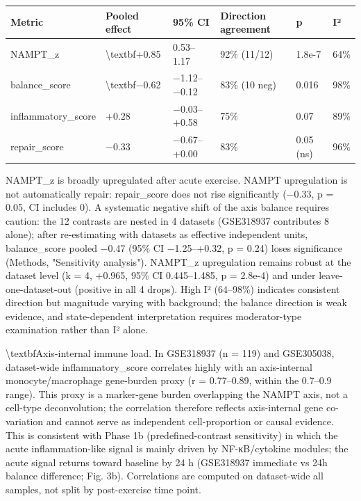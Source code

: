 \documentclass[11pt]{article}
\begin{document}
\begin{table}[h!]
\centering
\begin{tabular}{llllll}
\toprule
Metric & Pooled effect & 95\% CI & Direction agreement & p & I² \\
\midrule
NAMPT\_z & \textbackslash{}textbf{+0.85} & 0.53–1.17 & 92\% (11/12) & 1.8e-7 & 64\% \\
balance\_score & \textbackslash{}textbf{−0.62} & −1.12–−0.12 & 83\% (10 neg) & 0.016 & 98\% \\
inflammatory\_score & +0.28 & −0.03–+0.58 & 75\% & 0.07 & 89\% \\
repair\_score & −0.33 & −0.67–+0.00 & 83\% & 0.05 (ns) & 96\% \\
\bottomrule
\end{tabular}
\end{table}
\par\vspace{4pt}
NAMPT\_z is broadly upregulated after acute exercise. NAMPT upregulation is not automatically repair: repair\_score does not rise significantly (−0.33, p = 0.05, CI includes 0). A systematic negative shift of the axis balance requires caution: the 12 contrasts are nested in 4 datasets (GSE318937 contributes 8 alone); after re-estimating with datasets as effective independent units, balance\_score pooled −0.47 (95\% CI −1.25–+0.32, p = 0.24) loses significance (Methods, "Sensitivity analysis"). NAMPT\_z upregulation remains robust at the dataset level (k = 4, +0.965, 95\% CI 0.445–1.485, p = 2.8e-4) and under leave-one-dataset-out (positive in all 4 drops). High I² (64–98\%) indicates consistent direction but magnitude varying with background; the balance direction is weak evidence, and state-dependent interpretation requires moderator-type examination rather than I² alone.

\textbackslash{}textbf{Axis-internal immune load.} In GSE318937 (n = 119) and GSE305038, dataset-wide inflammatory\_score correlates highly with an axis-internal monocyte/macrophage gene-burden proxy (r = 0.77–0.89, within the 0.7–0.9 range). This proxy is a marker-gene burden overlapping the NAMPT axis, not a cell-type deconvolution; the correlation therefore reflects axis-internal gene co-variation and cannot serve as independent cell-proportion or causal evidence. This is consistent with Phase 1b (predefined-contrast sensitivity) in which the acute inflammation-like signal is mainly driven by NF-κB/cytokine modules; the acute signal returns toward baseline by 24 h (GSE318937 immediate vs 24h balance difference; Fig. 3b). Correlations are computed on dataset-wide all samples, not split by post-exercise time point.
\end{document}
